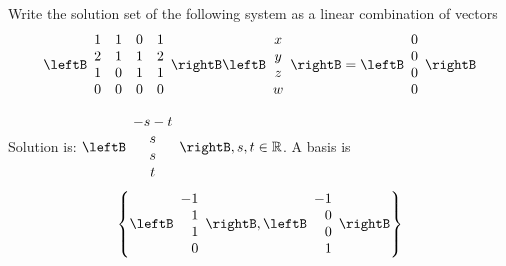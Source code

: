 \begin{enumialphparenastyle}
\begin{ex} \label{exerlineartransf7}Write the solution set of the following system as a linear combination of vectors
\begin{equation*}
\leftB
\begin{array}{rrrr}
1 & 1 & 0 & 1 \\
2 & 1 & 1 & 2 \\
1 & 0 & 1 & 1 \\
0 & 0 & 0 & 0
\end{array}
\rightB \leftB
\begin{array}{c}
x \\
y \\
z \\
w
\end{array}
\rightB =\leftB
\begin{array}{r}
0 \\
0 \\
0 \\
0
\end{array}
\rightB 
\end{equation*}
\begin{sol}
Solution is: $\leftB
\begin{array}{c}
-s-t \\
s \\
s \\
t
\end{array}
\rightB ,s,t\in \mathbb{R}$. A basis is
\[
\left\{ \leftB
\begin{array}{r}
-1 \\
1 \\
1 \\
0
\end{array}
\rightB ,\leftB
\begin{array}{r}
-1 \\
0 \\
0 \\
1
\end{array}
\rightB \right\}
\]
\end{sol}
\end{ex}



\end{enumialphparenastyle}
